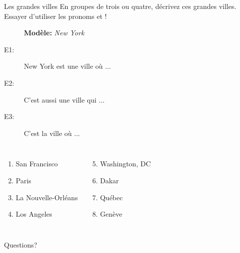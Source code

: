 \documentclass{beamer}
\begin{document}
  \begin{frame}{Les grandes villes}
    En groupes de trois ou quatre, décrivez ces grandes villes.
    Essayer d'utiliser les pronoms  et !
    \begin{description}
      \item[] \textbf{Modèle:} \textit{New York}
      \item[E1:] New York est une ville où ...
      \item[E2:] C'est aussi une ville qui ...
      \item[E3:] C'est la ville où ...
    \end{description}
    \begin{columns}[t]
        \begin{enumerate}
          \item San Francisco
          \item Paris
          \item La Nouvelle-Orléans
          \item Los Angeles
        \end{enumerate}
        \begin{enumerate}
          \setcounter{enumi}{4}
          \item Washington, DC
          \item Dakar
          \item Québec
          \item Genève
        \end{enumerate}
    \end{columns}
  \end{frame}

  \begin{frame}{}
    \begin{center}
      \Large Questions?
    \end{center}
  \end{frame}
\end{document}
